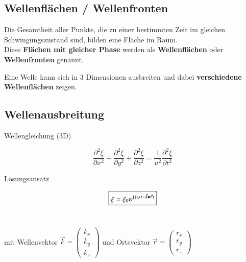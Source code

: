 \subsection{Wellenflächen / Wellenfronten}
Die Gesamtheit aller Punkte, die zu einer bestimmten Zeit im gleichen Schwingungszustand sind, bilden eine Fläche im Raum. \\

Diese \textbf{Flächen mit gleicher Phase} werden als \textbf{Wellenflächen} oder \textbf{Wellenfronten} genannt.\\
\vspace{0.2cm}

Eine Welle kann sich in 3 Dimensionen ausbreiten und dabei \textbf{verschiedene Wellenflächen} zeigen. 




\subsection{Wellenausbreitung}

\begin{minipage}{0.25\linewidth}
Wellengleichung (3D)
\end{minipage}
\hfill
\begin{minipage}{0.73\linewidth}
$$\boxed{ \frac{\partial^2 \xi}{\partial x^2} + \frac{\partial^2 \xi}{\partial y^2} + \frac{\partial^2 \xi}{\partial z^2} = \frac{1}{u^2} \frac{\partial^2 \xi}{\partial t^2}  }$$
\end{minipage}

\begin{minipage}{0.25\linewidth}
Lösungsansatz \\
\end{minipage}
\hfill
\begin{minipage}{0.73\linewidth}
$$ \boxed{ \xi = \xi_0 \e^{\jimg \, (\omega \, t - \vec{k} \bullet \vec{r})} }$$ \\
\end{minipage}

mit Wellenvektor $\vec{k} = \begin{pmatrix} k_x \\ k_y \\ k_z  \end{pmatrix}$ und Ortsvektor $ \vec{r} = \begin{pmatrix} r_x \\ r_y \\ r_z  \end{pmatrix}$




